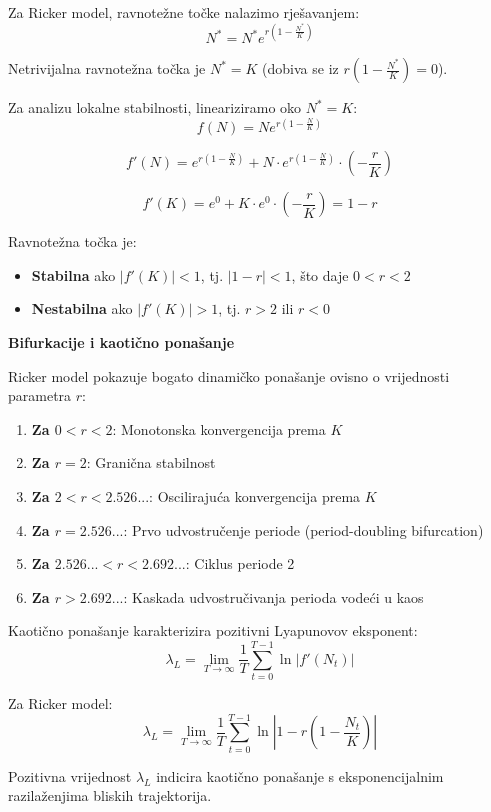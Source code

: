 \documentclass[11pt,oneside]{book}
\begin{document}
Za Ricker model, ravnotežne točke nalazimo rješavanjem:
$$N^* = N^* e^{r(1-\frac{N^*}{K})}$$

Netrivijalna ravnotežna točka je $N^* = K$ (dobiva se iz $r(1-\frac{N^*}{K}) = 0$).

Za analizu lokalne stabilnosti, lineariziramo oko $N^* = K$:
$$f(N) = N e^{r(1-\frac{N}{K})}$$

$$f'(N) = e^{r(1-\frac{N}{K})} + N \cdot e^{r(1-\frac{N}{K})} \cdot \left(-\frac{r}{K}\right)$$

$$f'(K) = e^0 + K \cdot e^0 \cdot \left(-\frac{r}{K}\right) = 1 - r$$

Ravnotežna točka je:

\begin{itemize}
	\item \textbf{Stabilna} ako $|f'(K)| < 1$, tj. $|1-r| < 1$, što daje $0 < r < 2$
	\item \textbf{Nestabilna} ako $|f'(K)| > 1$, tj. $r > 2$ ili $r < 0$
\end{itemize}

\textbf{Bifurkacije i kaotično ponašanje}

Ricker model pokazuje bogato dinamičko ponašanje ovisno o vrijednosti parametra $r$:

\begin{enumerate}
	\item \textbf{Za $0 < r < 2$}: Monotonska konvergencija prema $K$
	\item \textbf{Za $r = 2$}: Granična stabilnost
	\item \textbf{Za $2 < r < 2.526...$}: Oscilirajuća konvergencija prema $K$
	\item \textbf{Za $r = 2.526...$}: Prvo udvostručenje periode (period-doubling bifurcation)
	\item \textbf{Za $2.526... < r < 2.692...$}: Ciklus periode 2
	\item \textbf{Za $r > 2.692...$}: Kaskada udvostručivanja perioda vodeći u kaos
\end{enumerate}

Kaotično ponašanje karakterizira pozitivni Lyapunovov eksponent:
$$\lambda_L = \lim_{T \to \infty} \frac{1}{T} \sum_{t=0}^{T-1} \ln|f'(N_t)|$$

Za Ricker model:
$$\lambda_L = \lim_{T \to \infty} \frac{1}{T} \sum_{t=0}^{T-1} \ln|1 - r(1-\frac{N_t}{K})|$$

Pozitivna vrijednost $\lambda_L$ indicira kaotično ponašanje s eksponencijalnim razilaženjima bliskih trajektorija.
\end{document}
